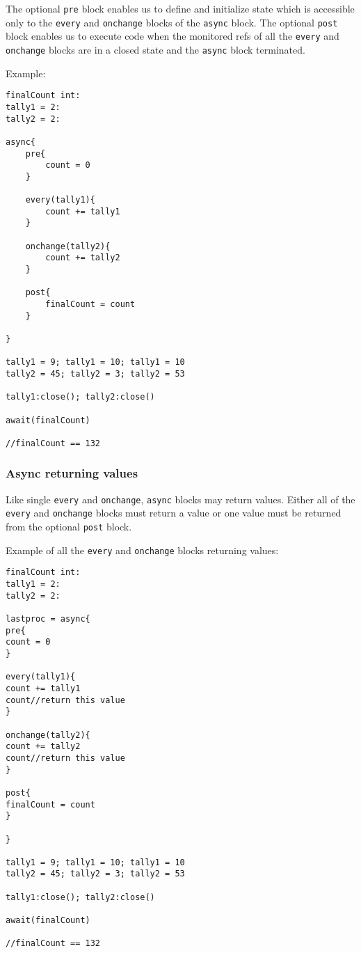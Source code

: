 \documentclass[conc-doc]{subfiles}
\begin{document}
The optional \lstinline{pre} block enables us to define and initialize state which is accessible only to the \lstinline{every} and \lstinline{onchange} blocks of the \lstinline{async} block. The optional \lstinline{post} block enables us to execute code when the monitored refs of all the \lstinline{every} and \lstinline{onchange} blocks are in a closed state and the \lstinline{async} block terminated.

Example:

\begin{lstlisting}
finalCount int:
tally1 = 2:
tally2 = 2:

async{
	pre{
		count = 0
	}
	
	every(tally1){
		count += tally1	
	}		
	
	onchange(tally2){
		count += tally2		
	}
	
	post{
		finalCount = count
	}
	
}

tally1 = 9; tally1 = 10; tally1 = 10
tally2 = 45; tally2 = 3; tally2 = 53

tally1:close(); tally2:close()

await(finalCount)

//finalCount == 132
\end{lstlisting}

\subsubsection{Async returning values}
Like single \lstinline{every} and \lstinline{onchange}, \lstinline{async} blocks may return values. Either all of the \lstinline{every} and \lstinline{onchange} blocks must return a value or one value must be returned from the optional \lstinline{post} block.

Example of all the \lstinline{every} and \lstinline{onchange} blocks returning values:
\begin{lstlisting}
finalCount int:
tally1 = 2:
tally2 = 2:

lastproc = async{
pre{
count = 0
}

every(tally1){
count += tally1
count//return this value
}		

onchange(tally2){
count += tally2		
count//return this value
}

post{
finalCount = count
}

}

tally1 = 9; tally1 = 10; tally1 = 10
tally2 = 45; tally2 = 3; tally2 = 53

tally1:close(); tally2:close()

await(finalCount)

//finalCount == 132
\end{lstlisting}
\end{document}
